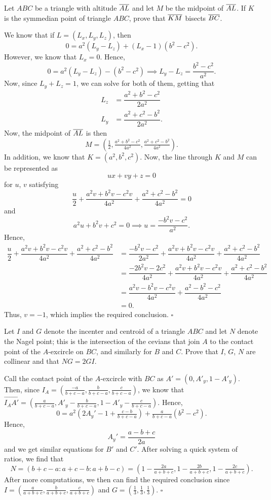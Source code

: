 \documentclass{article}
\begin{document}
\begin{problem}[7.31]{}
Let $ABC$ be a triangle with altitude $\overline{AL}$ and let $M$ be the midpoint of $\overline{AL}$. If $K$ is the symmedian point of triangle $ABC$, prove that $\overline{KM}$ bisects $\overline{BC}$.
\end{problem}

We know that if $L = (L_x, L_y, L_z)$, then \[0 = a^2(L_y-L_z)+(L_x-1)(b^2-c^2).\] However, we know that $L_x = 0$. Hence, \[0 = a^2(L_y-L_z)-(b^2-c^2) \implies L_y-L_z = \dfrac{b^2-c^2}{a^2}.\] Now, since $L_y + L_z = 1$, we can solve for both of them, getting that
\begin{align*}
L_z &= \dfrac{a^2+b^2-c^2}{2a^2} \\
L_y &= \dfrac{a^2+c^2-b^2}{2a^2}.
\end{align*}
Now, the midpoint of $\overline{AL}$ is then \[M = \left(\tfrac{1}{2}, \tfrac{a^2+b^2-c^2}{4a^2}, \tfrac{a^2+c^2-b^2}{4a^2}\right).\] In addition, we know that $K = (a^2, b^2, c^2)$. Now, the line through $K$ and $M$ can be represented as \[ux+vy+z = 0\] for $u$, $v$ satisfying \[\dfrac{u}{2}+\dfrac{a^2v+b^2v-c^2v}{4a^2}+\dfrac{a^2+c^2-b^2}{4a^2} = 0\] and \[a^2u+b^2v+c^2 = 0 \implies u = \dfrac{-b^2v-c^2}{a^2}.\] Hence,
\begin{align*}
\dfrac{u}{2}+\dfrac{a^2v+b^2v-c^2v}{4a^2}+\dfrac{a^2+c^2-b^2}{4a^2} &= \dfrac{-b^2v-c^2}{2a^2}+\dfrac{a^2v+b^2v-c^2v}{4a^2}+\dfrac{a^2+c^2-b^2}{4a^2} \\
&= \dfrac{-2b^2v-2c^2}{4a^2}+\dfrac{a^2v+b^2v-c^2v}{4a^2}+\dfrac{a^2+c^2-b^2}{4a^2} \\
&= \dfrac{a^2v-b^2v-c^2v}{4a^2}+\dfrac{a^2-b^2-c^2}{4a^2} \\
&= 0.
\end{align*}
Thus, $v = -1$, which implies the required conclusion. $\square$

\begin{problem}[7.32]{}
Let $I$ and $G$ denote the incenter and centroid of a triangle $ABC$ and let $N$ denote the Nagel point; this is the intersection of the cevians that join $A$ to the contact point of the $A$-excircle on $BC$, and similarly for $B$ and $C$. Prove that $I$, $G$, $N$ are collinear and that $NG = 2GI$.
\end{problem}

Call the contact point of the $A$-excircle with $BC$ as $A' = (0, A'_y, 1-A'_y)$. Then, since $I_A = \left(\tfrac{-a}{b+c-a}, \tfrac{b}{b+c-a}, \tfrac{c}{b+c-a}\right)$, we know that $\overrightarrow{I_AA'} = \left(\tfrac{a}{b+c-a}, A'_y-\tfrac{b}{b+c-a}, 1-A'_y-\tfrac{c}{b+c-a}\right)$. Hence, \[0 = a^2\left(2A_y'-1+\tfrac{c-b}{b+c-a}\right)+\tfrac{a}{b+c-a}\left(b^2-c^2\right).\] Hence, \[A_y' = \dfrac{a-b+c}{2a}\] and we get similar equations for $B'$ and $C'$. After solving a quick system of ratios, we find that \[N = (b+c-a : a+c-b : a+b-c) = \left(1-\tfrac{2a}{a+b+c}, 1-\tfrac{2b}{a+b+c}, 1-\tfrac{2c}{a+b+c}\right).\] After more computations, we then can find the required conclusion since $I = \left(\tfrac{a}{a+b+c}, \tfrac{b}{a+b+c}, \tfrac{c}{a+b+c}\right)$ and $G = \left(\tfrac{1}{3}, \tfrac{1}{3}, \tfrac{1}{3}\right)$. $\square$
\end{document}
